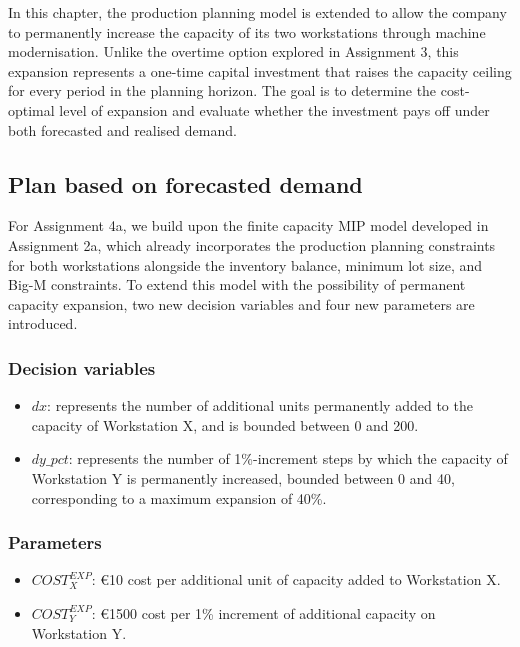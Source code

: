 \documentclass[a4paper,faculty=eb,language=en,doctype=article,sftitles=false]{ugent-doc}
\begin{document}
In this chapter, the production planning model is extended to allow the company to permanently increase the capacity of its two workstations through machine modernisation. Unlike the overtime option explored in Assignment 3, this expansion represents a one-time capital investment that raises the capacity ceiling for every period in the planning horizon. The goal is to determine the cost-optimal level of expansion and evaluate whether the investment pays off under both forecasted and realised demand.

\subsection{Plan based on forecasted demand}

For Assignment 4a, we build upon the finite capacity MIP model developed in Assignment 2a, which already incorporates the production planning constraints for both workstations alongside the inventory balance, minimum lot size, and Big-M constraints. To extend this model with the possibility of permanent capacity expansion, two new decision variables and four new parameters are introduced.

\subsubsection{Decision variables}

\begin{itemize}
    \item \(dx\): represents the number of additional units permanently added to the capacity of Workstation X, and is bounded between 0 and 200.
    \item \(dy\_pct\): represents the number of 1\%-increment steps by which the capacity of Workstation Y is permanently increased, bounded between 0 and 40, corresponding to a maximum expansion of 40\%.
\end{itemize}

\subsubsection{Parameters}

\begin{itemize}
    \item \(COST^{EXP}_{X}\): €10 cost per additional unit of capacity added to Workstation X.
    \item \(COST^{EXP}_{Y}\): €1500 cost per 1\% increment of additional capacity on Workstation Y.
\end{itemize}
\end{document}
